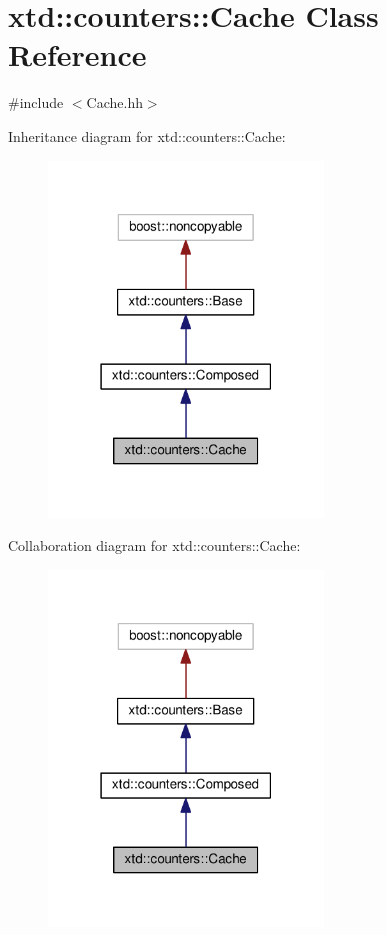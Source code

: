 \hypertarget{classxtd_1_1counters_1_1Cache}{}\section{xtd\+:\+:counters\+:\+:Cache Class Reference}
\label{classxtd_1_1counters_1_1Cache}


{\ttfamily \#include $<$Cache.\+hh$>$}



Inheritance diagram for xtd\+:\+:counters\+:\+:Cache\+:
\nopagebreak
\begin{figure}[H]
\begin{center}
\leavevmode
\includegraphics[width=207pt]{classxtd_1_1counters_1_1Cache__inherit__graph}
\end{center}
\end{figure}


Collaboration diagram for xtd\+:\+:counters\+:\+:Cache\+:
\nopagebreak
\begin{figure}[H]
\begin{center}
\leavevmode
\includegraphics[width=207pt]{classxtd_1_1counters_1_1Cache__coll__graph}
\end{center}
\end{figure}
